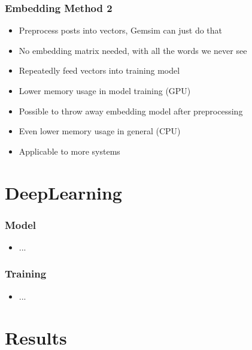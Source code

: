 \documentclass[compress,aspectratio=169]{beamer} %
\begin{document}
\begin{frame}[fragile]
	\frametitle{Embedding Method 2}
	\begin{itemize}
		\item Preprocess posts into vectors, Gemsim can just do that
		\item No embedding matrix needed, with all the words we never see
		\item Repeatedly feed vectors into training model
		\item Lower memory usage in model training (GPU)
		\item Possible to throw away embedding model after preprocessing
		\item Even lower memory usage in general (CPU)
		\item Applicable to more systems
	\end{itemize}
\end{frame}


\section{DeepLearning}

\begin{frame}[fragile]
	\frametitle{Model}
	\begin{itemize}
		\item ...
	\end{itemize}
\end{frame}

\begin{frame}[fragile]
	\frametitle{Training}
	\begin{itemize}
		\item ...
	\end{itemize}
\end{frame}

\section{Results}
\end{document}
